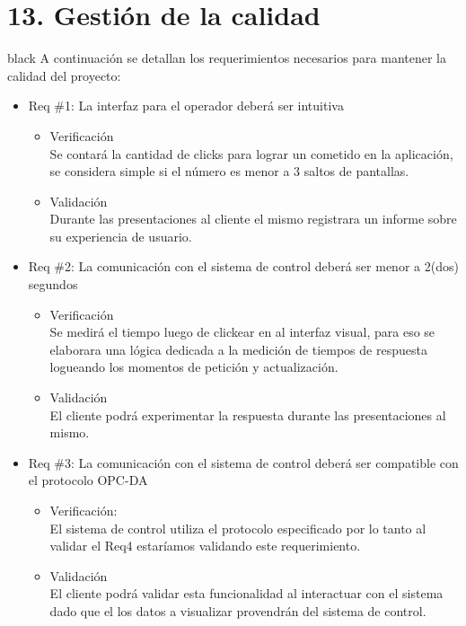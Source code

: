 \documentclass[11pt]{charter}
\begin{document}
\section{13. Gestión de la calidad}
\label{sec:calidad}

\begin{consigna}{black}
A continuación se detallan los requerimientos necesarios para mantener la calidad del proyecto:

\begin{itemize}
\item Req \#1: La interfaz para el operador deberá ser intuitiva


\begin{itemize}
\item Verificación\\
Se contará la cantidad de clicks para lograr un cometido en la aplicación, se considera simple si el número es menor a 3 saltos de pantallas.
\item Validación\\
Durante las presentaciones al cliente el mismo registrara un  informe sobre su experiencia de usuario.  
\end{itemize}


\item Req \#2: La comunicación con el sistema de control deberá ser menor a 2(dos) segundos


\begin{itemize}
\item Verificación\\
Se medirá el tiempo luego de clickear en al interfaz visual, para eso se elaborara una lógica dedicada a la medición de tiempos de respuesta logueando los momentos de petición y actualización. 
\item Validación\\
El cliente podrá experimentar la respuesta durante las presentaciones al mismo.  
\end{itemize}


\item Req \#3: La comunicación con el sistema de control deberá ser compatible con el protocolo OPC-DA 


\begin{itemize}
\item Verificación:\\
El sistema de control utiliza el protocolo especificado por lo tanto al validar el Req4 estaríamos validando este requerimiento. 
\item Validación\\
El cliente podrá validar esta funcionalidad al interactuar con el sistema dado que el los datos a visualizar provendrán del sistema de control.  
\end{itemize}



\end{itemize}
\end{consigna}
\end{document}
